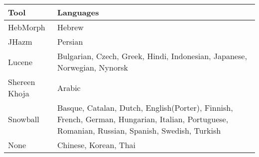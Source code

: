 \begin{tabular}{p{}p{}} 
	\hline \hline
	
	Tool & Languages \\
	
	\hline\hline
	
	HebMorph & 
	Hebrew \\
	\hline
	
	JHazm & 
	Persian\\
	\hline
	
	Lucene &
	Bulgarian, Czech, Greek, Hindi, Indonesian, Japanese, Norwegian, Nynorsk \\
	\hline
	
	
	Shereen Khoja &
	Arabic \\
	\hline
	

	Snowball &
	Basque, Catalan, Dutch, English(Porter), Finnish, French, German, Hungarian, Italian, Portuguese, Romanian, Russian, Spanish, Swedish, Turkish\\
	\hline
	
	None & 
	Chinese, Korean, Thai \\
	
	
	\hline \hline
\end{tabular}